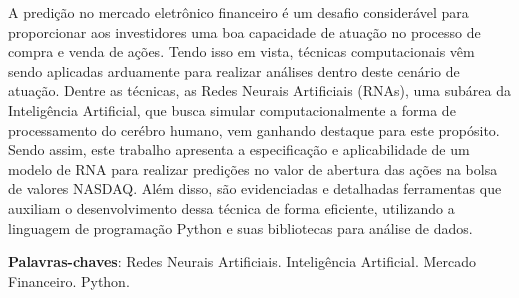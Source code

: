 \begin{resumo}[RESUMO]	
A predição no mercado eletrônico financeiro é um desafio considerável para proporcionar aos investidores uma boa capacidade de atuação no processo de compra e venda de ações. Tendo isso em vista, técnicas computacionais vêm sendo aplicadas arduamente para realizar análises dentro deste cenário de atuação. Dentre as técnicas, as Redes Neurais Artificiais (RNAs), uma subárea da Inteligência Artificial, que busca simular computacionalmente a forma de processamento do cerébro humano, vem ganhando destaque para este propósito. Sendo assim, este trabalho apresenta a especificação e aplicabilidade de um modelo de RNA para realizar predições no valor de abertura das ações na bolsa de valores NASDAQ. Além disso, são evidenciadas e detalhadas ferramentas que auxiliam o desenvolvimento dessa técnica de forma eficiente, utilizando a linguagem de programação Python e suas bibliotecas para análise de dados.

\vspace{\onelineskip}
    
\noindent
\textbf{Palavras-chaves}: Redes Neurais Artificiais. Inteligência Artificial. Mercado Financeiro. Python.
\end{resumo}
